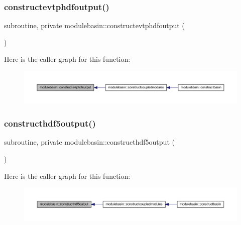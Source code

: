 \subsubsection{\texorpdfstring{constructevtphdfoutput()}{constructevtphdfoutput()}}
{\footnotesize\ttfamily subroutine, private modulebasin\+::constructevtphdfoutput (\begin{DoxyParamCaption}{ }\end{DoxyParamCaption})\hspace{0.3cm}{\ttfamily [private]}}

Here is the caller graph for this function\+:\nopagebreak
\begin{figure}[H]
\begin{center}
\leavevmode
\includegraphics[width=350pt]{namespacemodulebasin_abec73ddab1c13a2f52007dbd7a5adf56_icgraph}
\end{center}
\end{figure}
\mbox{\label{namespacemodulebasin_ad767dee07579ea3a5545d747a0d7cfcf}} 
\subsubsection{\texorpdfstring{constructhdf5output()}{constructhdf5output()}}
{\footnotesize\ttfamily subroutine, private modulebasin\+::constructhdf5output (\begin{DoxyParamCaption}{ }\end{DoxyParamCaption})\hspace{0.3cm}{\ttfamily [private]}}

Here is the caller graph for this function\+:\nopagebreak
\begin{figure}[H]
\begin{center}
\leavevmode
\includegraphics[width=350pt]{namespacemodulebasin_ad767dee07579ea3a5545d747a0d7cfcf_icgraph}
\end{center}
\end{figure}
\mbox{\label{namespacemodulebasin_a5a3aa456544a0c67f38a3d3655071347}} 
